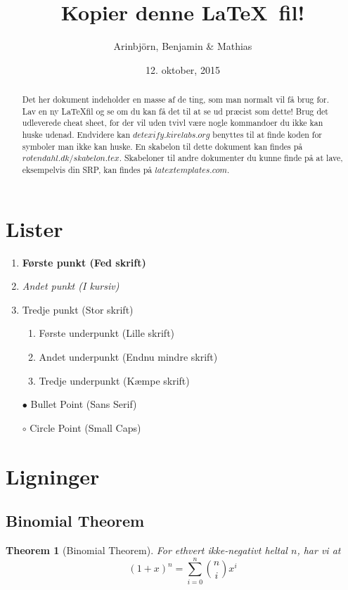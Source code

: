 \documentclass[]{article}
\newtheorem{theorem}{Theorem}
\begin{document}
\title{Kopier denne \LaTeX ~fil!}
\author{Arinbjörn, Benjamin \& Mathias}
\date{12. oktober, 2015}
\maketitle
\tableofcontents

\begin{abstract}

Det her dokument indeholder en masse af de ting, som man normalt vil få brug for. Lav en ny \LaTeX fil og se om du kan få det til at se ud præcist som dette! Brug det udleverede cheat sheet, for der vil uden tvivl være nogle kommandoer du ikke kan huske udenad. Endvidere kan $detexify.kirelabs.org$ benyttes til at finde koden for symboler man ikke kan huske. En skabelon til dette dokument kan findes på $rotendahl.dk/skabelon.tex$. Skabeloner til andre dokumenter du kunne finde på at lave, eksempelvis din SRP, kan findes på $latextemplates.com$.

\end{abstract}
\newpage

\section{Lister}
\begin{enumerate}
\item {\bf Første punkt (Fed skrift)}
\item {\em Andet punkt (I kursiv)}
\item {\Large Tredje punkt (Stor skrift)}
    \begin{enumerate}
        \item {\small Første underpunkt (Lille skrift)} 
        \item {\tiny Andet underpunkt (Endnu mindre skrift)} 
        \item {\Huge Tredje underpunkt (Kæmpe skrift)} 
    \end{enumerate}
\item[$\bullet$] {\sf Bullet Point (Sans Serif)}
\item[$\circ$] {\sc Circle Point (Small Caps)} 
\end{enumerate}


\section{Ligninger}
\subsection{Binomial Theorem}
\begin{theorem}[Binomial Theorem]
For ethvert ikke-negativt heltal $n$, har vi at 
\[
	(1+x)^n = \sum_{i=0}^n {n \choose i} x^i
\]
\end{theorem}
\end{document}

